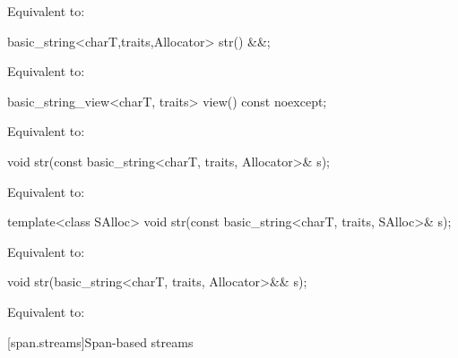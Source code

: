 \begin{itemdescr}
\pnum
\effects
Equivalent to: 
\end{itemdescr}

%
\begin{itemdecl}
basic_string<charT,traits,Allocator> str() &&;
\end{itemdecl}

\begin{itemdescr}
\pnum
\effects
Equivalent to: 
\end{itemdescr}

%
\begin{itemdecl}
basic_string_view<charT, traits> view() const noexcept;
\end{itemdecl}

\begin{itemdescr}
\pnum
\effects
Equivalent to: 
\end{itemdescr}

%
\begin{itemdecl}
void str(const basic_string<charT, traits, Allocator>& s);
\end{itemdecl}

\begin{itemdescr}
\pnum
\effects
Equivalent to: 
\end{itemdescr}

%
\begin{itemdecl}
template<class SAlloc>
  void str(const basic_string<charT, traits, SAlloc>& s);
\end{itemdecl}

\begin{itemdescr}
\pnum
\effects
Equivalent to: 
\end{itemdescr}

%
\begin{itemdecl}
void str(basic_string<charT, traits, Allocator>&& s);
\end{itemdecl}

\begin{itemdescr}
\pnum
\effects
Equivalent to: 
\end{itemdescr}

[span.streams]{Span-based streams}

